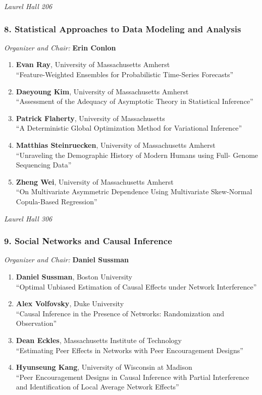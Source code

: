 \emph{Laurel Hall 206} \\[.5em]

\subsubsection*{8. Statistical Approaches to Data Modeling and Analysis}

\emph{Organizer and Chair:} \textbf{Erin Conlon}

\begin{enumerate}
\item \textbf{Evan Ray}, University of Massachusetts Amherst \\
``Feature-Weighted Ensembles for Probabilistic Time-Series Forecasts''
\item \textbf{Daeyoung Kim}, University of Massachusetts Amherst \\
``Assessment of the Adequacy of Asymptotic Theory in Statistical Inference''
\item \textbf{Patrick Flaherty}, University of Massachusetts \\
``A Deterministic Global Optimization Method for Variational Inference''
\item \textbf{Matthias Steinruecken}, University of Massachusetts Amherst \\
``Unraveling the Demographic History of Modern Humans using Full- Genome Sequencing Data''
\item \textbf{Zheng Wei}, University of Massachusetts Amherst \\
``On Multivariate Asymmetric Dependence Using Multivariate Skew-Normal Copula-Based Regression''
\end{enumerate}

\emph{Laurel Hall 306} \\[.5em]

\subsubsection*{9. Social Networks and Causal Inference}

\emph{Organizer and Chair:} \textbf{Daniel Sussman}

\begin{enumerate}
\item \textbf{Daniel Sussman}, Boston University \\
``Optimal Unbiased Estimation of Causal Effects under Network Interference''
\item \textbf{Alex Volfovsky}, Duke University \\
``Causal Inference in the Presence of Networks: Randomization and Observation''
\item \textbf{Dean Eckles}, Massachusetts Institute of Technology \\
``Estimating Peer Effects in Networks with Peer Encouragement Designs''
\item \textbf{Hyunseung Kang}, University of Wisconsin at Madison \\
``Peer Encouragement Designs in Causal Inference with Partial Interference and Identification of Local Average Network Effects''
\end{enumerate}

